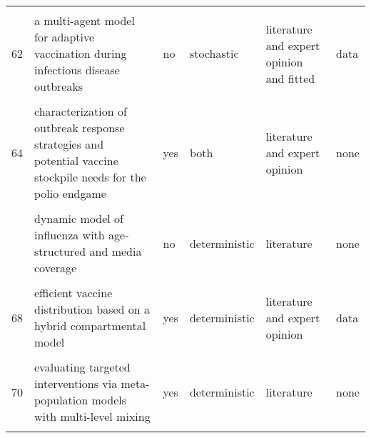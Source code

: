 \documentclass[
]{article}
\begin{document}
\begin{landscape}
\begin{longtable}{l>{\raggedright\arraybackslash}p{3cm}l>{\raggedright\arraybackslash}p{3cm}ll}
\addlinespace
\cellcolor{gray!6}{61} & \cellcolor{gray!6}{a mathematical model of ebola virus disease: using sensitivity analysis to determine effective intervention targets} & \cellcolor{gray!6}{no} & \cellcolor{gray!6}{deterministic} & \cellcolor{gray!6}{literature and expert opinion} & \cellcolor{gray!6}{none}\\
62 & a multi-agent model for adaptive vaccination during infectious disease outbreaks & no & stochastic & literature and expert opinion and fitted & data\\
\cellcolor{gray!6}{63} & \cellcolor{gray!6}{assessing the efficiency of movement restriction as a control strategy of ebola} & \cellcolor{gray!6}{yes} & \cellcolor{gray!6}{deterministic} & \cellcolor{gray!6}{literature} & \cellcolor{gray!6}{none}\\
64 & characterization of outbreak response strategies and potential vaccine stockpile needs for the polio endgame & yes & both & literature and expert opinion & none\\
\cellcolor{gray!6}{65} & \cellcolor{gray!6}{designing public health policies to mitigate the adverse consequences of rural-urban migration via meta-population modeling} & \cellcolor{gray!6}{yes} & \cellcolor{gray!6}{both} & \cellcolor{gray!6}{literature and expert opinion} & \cellcolor{gray!6}{none}\\
\addlinespace
66 & dynamic model of influenza with age-structured and media coverage & no & deterministic & literature & none\\
\cellcolor{gray!6}{67} & \cellcolor{gray!6}{economic evaluation of individual school closure strategies: the hong kong 2009 h1n1 pandemic} & \cellcolor{gray!6}{yes} & \cellcolor{gray!6}{both} & \cellcolor{gray!6}{literature and fitted} & \cellcolor{gray!6}{data}\\
68 & efficient vaccine distribution based on a hybrid compartmental model & yes & deterministic & literature and expert opinion & data\\
\cellcolor{gray!6}{69} & \cellcolor{gray!6}{epidemiological evaluation of different fmd control strategies in two selected regions in austria} & \cellcolor{gray!6}{yes} & \cellcolor{gray!6}{deterministic} & \cellcolor{gray!6}{literature} & \cellcolor{gray!6}{none}\\
70 & evaluating targeted interventions via meta-population models with multi-level mixing & yes & deterministic & literature & none\\
\addlinespace
\cellcolor{gray!6}{71} & \cellcolor{gray!6}{evaluation of outbreak response immunization in the control of pertussis using agent-based modeling} & \cellcolor{gray!6}{yes} & \cellcolor{gray!6}{stochastic} & \cellcolor{gray!6}{literature and expert opinion and fitted} & \cellcolor{gray!6}{data}\\

\end{longtable}
\end{landscape}
\end{document}
